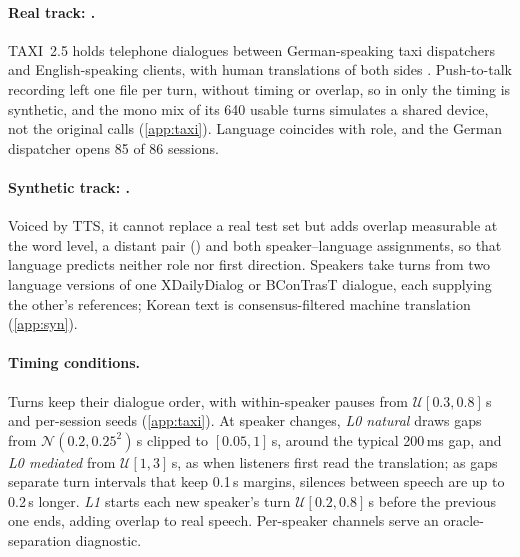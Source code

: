 

\paragraph{Real track: \taxi.}\label{sec:bench-taxi}
TAXI~2.5 holds telephone dialogues between German-speaking taxi dispatchers and English-speaking clients, with human translations of both sides \citep{bas2001taxi,reichel2016bas}. Push-to-talk recording left one file per turn, without timing or overlap, so in \taxi only the timing is synthetic, and the mono mix of its 640 usable turns simulates a shared device, not the original calls (\cref{app:taxi}). Language coincides with role, and the German dispatcher opens 85 of 86 sessions.

\paragraph{Synthetic track: \syn.}\label{sec:bench-syn}
Voiced by TTS, it cannot replace a real test set but adds overlap measurable at the word level, a distant pair () and both speaker--language assignments, so that language predicts neither role nor first direction. Speakers take turns from two language versions of one XDailyDialog \citep{liu2023xdailydialog} or BConTrasT \citep{farajian2020findings} dialogue, each supplying the other's references; Korean text is consensus-filtered machine translation (\cref{app:syn}).

\paragraph{Timing conditions.}\label{sec:bench-timing}
Turns keep their dialogue order, with within-speaker pauses from $\mathcal{U}[0.3,0.8]$\,s and per-session seeds (\cref{app:taxi}). At speaker changes, \emph{L0 natural} draws gaps from $\mathcal{N}(0.2,0.25^2)$\,s clipped to $[0.05,1]$\,s, around the typical 200\,ms gap, and \emph{L0 mediated} from $\mathcal{U}[1,3]$\,s, as when listeners first read the translation; as gaps separate turn intervals that keep 0.1\,s margins, silences between speech are up to 0.2\,s longer. \emph{L1} starts each new speaker's turn $\mathcal{U}[0.2,0.8]$\,s before the previous one ends, adding overlap to real speech. Per-speaker channels serve an oracle-separation diagnostic.

